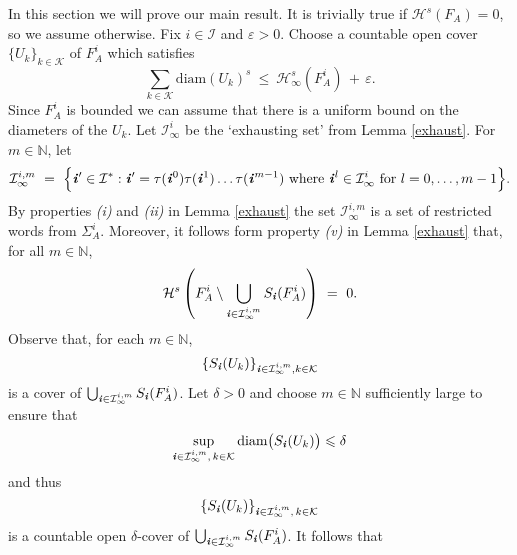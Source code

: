 \documentclass[11pt,english,british]{article}
\numberwithin{equation}{section}
\renewcommand{\leq}{\leqslant}
\begin{document}
In this section we will prove our main result.  It is trivially true if $\mathcal{H}^s(F_A) = 0$, so we assume otherwise.  Fix $i \in \mathcal{I}$ and $\varepsilon>0$.  Choose a countable open cover $\{U_k\}_{k \in \mathcal{K}}$ of $F_A^i$ which satisfies
\begin{equation} \label{111}
 \sum_{k \in \mathcal{K}} \text{diam}( U_k )^s \ \leq  \ \mathcal{H}^s_\infty(F_A^i) \, + \, \varepsilon.
\end{equation}
Since $F_A^i$ is bounded we can assume that there is a uniform bound on the diameters of the $U_k$.  Let $\mathcal{I}^{i}_\infty$ be the `exhausting set' from Lemma \ref{exhaust}.  For $m \in \mathbb{N}$, let
\begin{equation} \label{abab}
\mathcal{I}^{i,m}_\infty \ = \ \Big\{ \textbf{\emph{i}}' \in \mathcal{I}^* : \textbf{\emph{i}}' = \tau(\textbf{\emph{i}}^0)  \tau(\textbf{\emph{i}}^1) \dots  \tau(\textbf{\emph{i}}^{m-1}) \text{ where } \textbf{\emph{i}}^l \in \mathcal{I}^{i}_\infty \text{ for } l=0, \dots, m-1 \Big\}.
\end{equation}
By properties \emph{(i)} and \emph{(ii)} in Lemma \ref{exhaust} the set $\mathcal{I}^{i,m}_\infty$ is a set of restricted words from $\Sigma^{i}_A$.  Moreover, it follows form property \emph{(v)} in Lemma \ref{exhaust} that, for all $m \in \mathbb{N}$,
\begin{equation} \label{222}
 \mathcal{H}^s \left(F_A^i \setminus \bigcup_{\textbf{\emph{i}} \in \mathcal{I}^{i,m}_\infty} S_\textbf{\emph{i}}(F_A^i) \right)  \ = \ 0.
\end{equation}
Observe that, for each $m \in \mathbb{N}$, 
\[
\{  S_\textbf{\emph{i}}(U_k) \}_{\textbf{\emph{i}} \in \mathcal{I}^{i,m}_\infty, k \in \mathcal{K}}
\]
is a cover of $\bigcup_{\textbf{\emph{i}} \in \mathcal{I}^{i,m}_\infty}  S_\textbf{\emph{i}}(F_A^i)$.  Let $\delta>0$ and choose $m \in \mathbb{N}$ sufficiently large to ensure that
\[
\sup_{\textbf{\emph{i}} \in \mathcal{I}^{i,m}_\infty, \, k \in \mathcal{K}} \text{diam}\big(  S_\textbf{\emph{i}}(U_k) \big) \leq \delta
\]
and thus
\[
\{  S_\textbf{\emph{i}}(U_k) \}_{\textbf{\emph{i}} \in \mathcal{I}^{i,m}_\infty, \,  k \in \mathcal{K}}
\]
is a countable open $\delta$-cover of $\bigcup_{\textbf{\emph{i}} \in \mathcal{I}^{i,m}_\infty}  S_\textbf{\emph{i}}(F_A^i)$.  It follows  that
\end{document}
